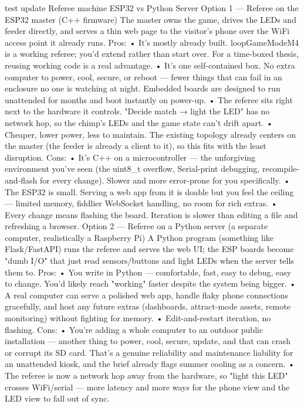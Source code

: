 test update
Referee machine
ESP32 vs Python Server
Option 1 — Referee on the ESP32 master (C++ firmware)
The master owns the game, drives the LEDs and feeder directly, and serves a thin web page to the visitor's phone over the WiFi access point it already runs.
Pros:
•	It's mostly already built. loopGameModeM4 is a working referee; you'd extend rather than start over. For a time-boxed thesis, reusing working code is a real advantage.
•	It's one self-contained box. No extra computer to power, cool, secure, or reboot — fewer things that can fail in an enclosure no one is watching at night. Embedded boards are designed to run unattended for months and boot instantly on power-up.
•	The referee sits right next to the hardware it controls. "Decide match → light the LED" has no network hop, so the chimp's LEDs and the game state can't drift apart.
•	Cheaper, lower power, less to maintain. The existing topology already centers on the master (the feeder is already a client to it), so this fits with the least disruption.
Cons:
•	It's C++ on a microcontroller — the unforgiving environment you've seen (the uint8_t overflow, Serial-print debugging, recompile-and-flash for every change). Slower and more error-prone for you specifically.
•	The ESP32 is small. Serving a web app from it is doable but you feel the ceiling — limited memory, fiddlier WebSocket handling, no room for rich extras.
•	Every change means flashing the board. Iteration is slower than editing a file and refreshing a browser.
Option 2 — Referee on a Python server (a separate computer, realistically a Raspberry Pi)
A Python program (something like Flask/FastAPI) runs the referee and serves the web UI; the ESP boards become "dumb I/O" that just read sensors/buttons and light LEDs when the server tells them to.
Pros:
•	You write in Python — comfortable, fast, easy to debug, easy to change. You'd likely reach "working" faster despite the system being bigger.
•	A real computer can serve a polished web app, handle flaky phone connections gracefully, and host any future extras (dashboards, attract-mode assets, remote monitoring) without fighting for memory.
•	Edit-and-restart iteration, no flashing.
Cons:
•	You're adding a whole computer to an outdoor public installation — another thing to power, cool, secure, update, and that can crash or corrupt its SD card. That's a genuine reliability and maintenance liability for an unattended kiosk, and the brief already flags summer cooling as a concern.
•	The referee is now a network hop away from the hardware, so "light this LED" crosses WiFi/serial — more latency and more ways for the phone view and the LED view to fall out of sync.

